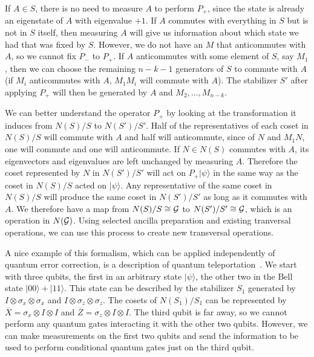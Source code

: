\documentclass{report}
\newcommand{\G}{{\cal G}}
\newcommand{\ket}[1]{|{#1}\rangle}
\newcommand{\X}{\sigma_x}
\newcommand{\Z}{\sigma_z}
\newcommand{\Xbar}{\overline{X}}
\newcommand{\Zbar}{\overline{Z}}
\begin{document}
If $A \in S$, there is no need to measure $A$ to perform $P_+$, since the 
state is already an eigenstate of $A$ with eigenvalue $+1$.  If $A$ 
commutes with everything in $S$ but is not in $S$ itself, then measuring 
$A$ will give us information about which state we had that was fixed by $S$.  
However, we do not have an $M$ that anticommutes with $A$, so we 
cannot fix $P_-$ to $P_+$.  If $A$ anticommutes with some element of $S$, say 
$M_1$, then we can choose the remaining $n-k-1$ generators of $S$ to 
commute with $A$ (if $M_i$ anticommutes with $A$, $M_1 M_i$ will 
commute with $A$).  The stabilizer $S'$ after applying $P_+$ will then be 
generated by $A$ and $M_2, \ldots, M_{n-k}$.

We can better understand the operator $P_+$ by looking at the 
transformation it induces from $N(S)/S$ to $N(S')/S'$.  Half of the 
representatives of each coset in $N(S)/S$ will commute with $A$ and half 
will anticommute, since of $N$ and $M_1 N$, one will commute and one 
will anticommute.  If $N \in N(S)$ commutes with $A$, its eigenvectors and 
eigenvalues are left unchanged by measuring $A$.  Therefore the coset 
represented by $N$ in $N(S')/S'$ will act on $P_+ \ket{\psi}$ in the same 
way as the coset in $N(S)/S$ acted on $\ket{\psi}$.  Any representative of 
the same coset in $N(S)/S$ will produce the same coset in $N(S')/S'$ as long 
as it commutes with $A$.  We therefore have a map from $N(S)/S \cong 
\G$ to $N(S')/S' \cong \G$, which is an operation in $N(\G)$.  Using selected 
ancilla preparation and existing tranversal operations, we can use this 
process to create new transversal operations.

A nice example of this formalism, which can be applied independently of
quantum error correction, is a description of quantum 
teleportation~\cite{bennett-teleport}.  We start with three qubits, the first 
in an arbitrary state $\ket{\psi}$, the other two in the Bell state $\ket{00} 
+ \ket{11}$.  This state can be described by the stabilizer $S_1$ generated 
by $I \otimes \X \otimes \X$ and $I \otimes \Z \otimes \Z$.  The cosets of 
$N(S_1)/S_1$ can be represented by $\Xbar = \X \otimes I \otimes I$ and 
$\Zbar = \Z \otimes I \otimes I$.  The third qubit is far away, so we cannot 
perform any quantum gates interacting it with the other two qubits.  
However, we can make measurements on the first two qubits and send the 
information to be used to perform conditional quantum gates just on the 
third qubit.
\end{document}
